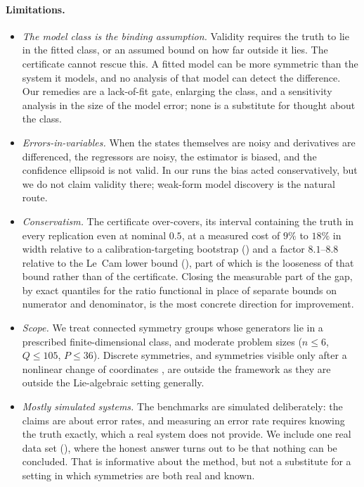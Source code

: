 \paragraph{Limitations.}
\begin{itemize}\itemsep2pt
\item \emph{The model class is the binding assumption.} Validity requires the
  truth to lie in the fitted class, or an assumed bound on how far outside it
  lies. The certificate cannot rescue this. A fitted model can be more symmetric than the system it models, and no analysis of that model can detect the difference. Our remedies are a
  lack-of-fit gate, enlarging the class, and a sensitivity analysis in the size
  of the model error; none is a substitute for thought about the class.
\item \emph{Errors-in-variables.} When the states themselves are noisy and
  derivatives are differenced, the regressors are noisy, the estimator is
  biased, and the confidence ellipsoid is not valid. In our runs the bias acted
  conservatively, but we do not claim validity there; weak-form model discovery
  \citep{messenger2021weak} is the natural route.
\item \emph{Conservatism.} The certificate over-covers, its interval containing the truth in every replication even at nominal $0.5$, at a measured cost of
  $9\%$ to $18\%$ in width relative to a calibration-targeting bootstrap
  () and a factor $8.1$--$8.8$ relative to the Le~Cam lower
  bound (), part of which is the looseness of that bound
  rather than of the certificate. Closing the measurable part of the gap, by exact quantiles for the ratio functional in place of separate bounds on numerator and denominator, is the most concrete direction for improvement.
\item \emph{Scope.} We treat connected symmetry groups whose generators lie in a
  prescribed finite-dimensional class, and moderate problem sizes ($n \le 6$,
  $Q \le 105$, $P \le 36$). Discrete symmetries, and symmetries visible only
  after a nonlinear change of coordinates \citep{liu2022machine,yang2024latent},
  are outside the framework as they are outside the Lie-algebraic setting
  generally.
\item \emph{Mostly simulated systems.} The benchmarks are simulated
  deliberately: the claims are about error rates, and measuring an error rate
  requires knowing the truth exactly, which a real system does not provide. We
  include one real data set (), where the honest answer turns
  out to be that nothing can be concluded. That is informative about the method, but not a substitute for a setting in which symmetries are both real and known.
\end{itemize}


